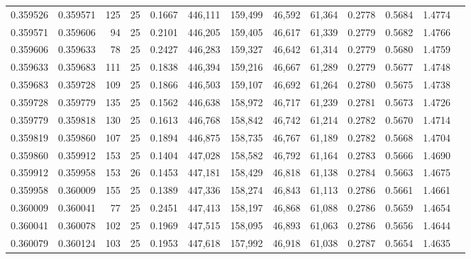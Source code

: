 \begin{tabular}{rrrrrrrrrrrrr}
0.359526 & 0.359571 &   125 &  25 &                                     0.1667 & 446,111 & 159,499 &  46,592 &  61,364 & 0.2778 & 0.5684 & 1.4774 \\
0.359571 & 0.359606 &    94 &  25 &                                     0.2101 & 446,205 & 159,405 &  46,617 &  61,339 & 0.2779 & 0.5682 & 1.4766 \\
0.359606 & 0.359633 &    78 &  25 &                                     0.2427 & 446,283 & 159,327 &  46,642 &  61,314 & 0.2779 & 0.5680 & 1.4759 \\
0.359633 & 0.359683 &   111 &  25 &                                     0.1838 & 446,394 & 159,216 &  46,667 &  61,289 & 0.2779 & 0.5677 & 1.4748 \\
0.359683 & 0.359728 &   109 &  25 &                                     0.1866 & 446,503 & 159,107 &  46,692 &  61,264 & 0.2780 & 0.5675 & 1.4738 \\
0.359728 & 0.359779 &   135 &  25 &                                     0.1562 & 446,638 & 158,972 &  46,717 &  61,239 & 0.2781 & 0.5673 & 1.4726 \\
0.359779 & 0.359818 &   130 &  25 &                                     0.1613 & 446,768 & 158,842 &  46,742 &  61,214 & 0.2782 & 0.5670 & 1.4714 \\
0.359819 & 0.359860 &   107 &  25 &                                     0.1894 & 446,875 & 158,735 &  46,767 &  61,189 & 0.2782 & 0.5668 & 1.4704 \\
0.359860 & 0.359912 &   153 &  25 &                                     0.1404 & 447,028 & 158,582 &  46,792 &  61,164 & 0.2783 & 0.5666 & 1.4690 \\
0.359912 & 0.359958 &   153 &  26 &                                     0.1453 & 447,181 & 158,429 &  46,818 &  61,138 & 0.2784 & 0.5663 & 1.4675 \\
0.359958 & 0.360009 &   155 &  25 &                                     0.1389 & 447,336 & 158,274 &  46,843 &  61,113 & 0.2786 & 0.5661 & 1.4661 \\
0.360009 & 0.360041 &    77 &  25 &                                     0.2451 & 447,413 & 158,197 &  46,868 &  61,088 & 0.2786 & 0.5659 & 1.4654 \\
0.360041 & 0.360078 &   102 &  25 &                                     0.1969 & 447,515 & 158,095 &  46,893 &  61,063 & 0.2786 & 0.5656 & 1.4644 \\
0.360079 & 0.360124 &   103 &  25 &                                     0.1953 & 447,618 & 157,992 &  46,918 &  61,038 & 0.2787 & 0.5654 & 1.4635 \\

\end{tabular}
